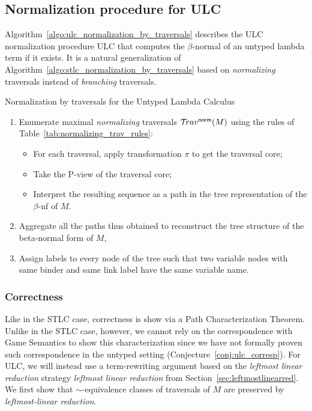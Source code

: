 \documentclass{article}
\theoremstyle{definition}
\newcommand{\normalizing}{{\sf norm}}
\newcommand{\travsetnorm}{\travset^\normalizing}
\def\coresymbol{\pi} %
\begin{document}
\subsection{Normalization procedure for ULC}

Algorithm~\ref{algo:ulc_normalization_by_traversals} describes the ULC normalization procedure ULC that computes the $\beta$-normal of an untyped lambda term if it exists. It is a natural generalization of Algorithm~\ref{algo:stlc_normalization_by_traversals} based on \emph{normalizing} traversals instead of \emph{branching} traversals.

\begin{algorithm}[!ht]
\begin{algorithmic}
\caption{Normalization by traversals for the Untyped Lambda Calculus}
\label{algo:ulc_normalization_by_traversals}
\begin{enumerate}
  \item Enumerate maximal \emph{normalizing} traversals $\travsetnorm(M)$ using the rules of Table~\ref{tab:normalizing_trav_rules}:
  \begin{itemize}
  \item For each traversal, apply transformation $\coresymbol$ to get the traversal core;
  \item Take the P-view of the traversal core;
  \item Interpret the resulting sequence as a path
  in the tree representation of the $\beta$-nf of $M$.
  \end{itemize}
  \item Aggregate all the paths thus obtained to reconstruct the tree structure of the beta-normal form of $M$,
  \item Assign labels to every node of the tree such that two variable nodes with same binder and same link label have the same variable name.
\end{enumerate}
\end{algorithmic}
\end{algorithm}

\subsubsection*{Correctness}

Like in the STLC case, correctness is show via a Path Characterization Theorem.
Unlike in the STLC case, however, we cannot rely on the correspondence with Game Semantics to show this characterization since we have not formally proven such correspondence in the untyped setting (Conjecture~\ref{conj:ulc_corresp}).
For ULC, we will instead use a term-rewriting argument based on the \emph{leftmost linear reduction} strategy \emph{leftmost linear reduction} from Section~\ref{sec:leftmostlinearred}. We first show that $\sim$-equivalence classes of traversals of $M$ are preserved by \emph{leftmost-linear reduction}.
\end{document}
